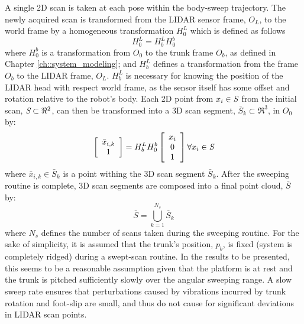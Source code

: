			A single 2D scan is taken at each \Kth pose within the body-sweep trajectory. The newly acquired scan is transformed from the LIDAR sensor frame, $O_{L}$, to the world frame by a homogeneous transformation $H^{L}_{0}$ which is defined as follows
				\begin{equation}
					H^{L}_{0} = H^{L}_{b} H^{b}_{0}
					\label{eq::world_to_sensor}
				\end{equation}
			where $H^{b}_{0}$ is a transformation from $O_{0}$ to the trunk frame $O_{b}$, as defined in Chapter \ref{ch::system_modeling}; and $H^{L}_{b}$ defines a transformation from the frame $O_{b}$ to the LIDAR frame, $O_{L}$. $H^{L}_{b}$ is necessary for knowing the position of the LIDAR head with respect world frame, as the sensor itself has some offset and rotation relative to the robot's body. Each 2D point from $x_{i} \in \emph{S}$ from the initial scan, $\emph{S}\subset \Re^{2}$, can then be transformed into a 3D scan segment, $\bar{S}_{k} \subset \Re^{3}$, in $O_{0}$ by:
				\begin{equation}
					\left[
						\begin{array}{c}
							\bar{x}_{i,k} \\ 1
						\end{array}
					\right]
				 = H^{L}_{b} H^{b}_{0}	
					\left[
						\begin{array}{c}
							x_{i} \\ 0 \\ 1
						\end{array}
					\right] \forall x_{i} \in \emph{S}
					\label{eq::scan_to_segment}
				\end{equation}
			where $\bar{x}_{i,k} \in \bar{S}_{k}$ is a point withing the 3D \Kth scan segment $\bar{S}_{k}$. After the sweeping routine is complete, 3D scan segments are composed into a final point cloud, $\bar{S}$ by:
			\begin{equation}
				\bar{S} = \bigcup_{k=1}^{N_{s}} \bar{S}_{k}
			\end{equation}
			where $N_{s}$ defines the number of scans taken during the sweeping routine. For the sake of simplicity, it is assumed that the trunk's position, $p_{b}$, is fixed (system is completely ridged) during a swept-scan routine. In the results to be presented, this seems to be a reasonable assumption given that the platform is at rest and the trunk is pitched sufficiently slowly over the angular sweeping range. A slow sweep rate ensures that perturbations caused by vibrations incurred by trunk rotation and foot-slip are small, and thus do not cause for significant deviations in LIDAR scan points.
